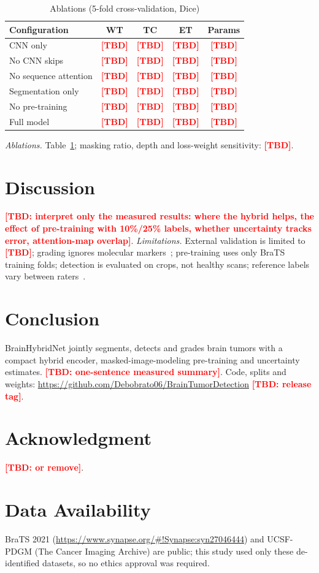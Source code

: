 \documentclass[journal]{IEEEtran}
\newcommand{\tbd}[1][]{\textcolor{red}{\textbf{[TBD#1]}}}
\begin{document}
\begin{table}[!t]
\caption{Ablations (5-fold cross-validation, Dice)}
\label{tab:abl}
\centering
\begin{tabular}{lcccc}
\toprule
Configuration & WT & TC & ET & Params\\
\midrule
CNN only & \tbd & \tbd & \tbd & \tbd\\
No CNN skips & \tbd & \tbd & \tbd & \tbd\\
No sequence attention & \tbd & \tbd & \tbd & \tbd\\
Segmentation only & \tbd & \tbd & \tbd & \tbd\\
No pre-training & \tbd & \tbd & \tbd & \tbd\\
Full model & \tbd & \tbd & \tbd & \tbd\\
\bottomrule
\end{tabular}
\end{table}

\textit{Ablations.} Table~\ref{tab:abl}; masking ratio, depth and loss-weight sensitivity: \tbd.

\section{Discussion}
\tbd[: interpret only the measured results: where the hybrid helps, the effect of pre-training with 10\%/25\% labels, whether uncertainty tracks error, attention-map overlap].
\textit{Limitations.} External validation is limited to \tbd; grading ignores molecular markers~\cite{louis2021who}; pre-training uses only BraTS training folds; detection is evaluated on crops, not healthy scans; reference labels vary between raters~\cite{menze2015}.

\section{Conclusion}
BrainHybridNet jointly segments, detects and grades brain tumors with a compact hybrid encoder, masked-image-modeling pre-training and uncertainty estimates. \tbd[: one-sentence measured summary]. Code, splits and weights: \url{https://github.com/Debobrato06/BrainTumorDetection} \tbd[: release tag].

\section*{Acknowledgment}
\tbd[: or remove].

\section*{Data Availability}
BraTS 2021 (\url{https://www.synapse.org/#!Synapse:syn27046444}) and UCSF-PDGM (The Cancer Imaging Archive) are public; this study used only these de-identified datasets, so no ethics approval was required.



\end{document}

